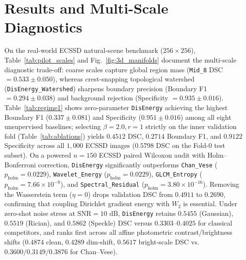 \documentclass[preprint,12pt]{elsarticle}
\begin{document}
\section{Results and Multi-Scale Diagnostics}
On the real-world ECSSD natural-scene benchmark ($256 \times 256$), Table~\ref{tab:pilot_scales} and Fig.~\ref{fig:3d_manifolds} document the multi-scale diagnostic trade-off: coarse scales capture global region mass (\texttt{Mid\_8} DSC $= 0.533 \pm 0.050$), whereas crest-snapping topological watershed (\texttt{DisEnergy\_Watershed}) sharpens boundary precision (Boundary F1 $= 0.294 \pm 0.038$) and background rejection (Specificity $= 0.935 \pm 0.016$). Table~\ref{tab:regime1} shows zero-parameter \texttt{DisEnergy} achieving the highest Boundary F1 ($0.337 \pm 0.081$) and Specificity ($0.951 \pm 0.016$) among all eight unsupervised baselines; selecting $\beta=2.0, r=1$ strictly on the inner validation fold (Table~\ref{tab:ablations}) yields $0.4512$ DSC, $0.2714$ Boundary F1, and $0.9122$ Specificity across all $1,000$ ECSSD images ($0.5798$ DSC on the Fold-0 test subset). On a powered $n=150$ ECSSD paired Wilcoxon audit with Holm--Bonferroni correction, \texttt{DisEnergy} significantly outperforms \texttt{Chan\_Vese} ($p_{\mathrm{holm}}=0.0229$), \texttt{Wavelet\_Energy} ($p_{\mathrm{holm}}=0.0229$), \texttt{GLCM\_Entropy} ($p_{\mathrm{holm}}=7.66\times 10^{-8}$), and \texttt{Spectral\_Residual} ($p_{\mathrm{holm}}=3.80\times 10^{-16}$). Removing the Wasserstein term ($\eta=0$) drops validation DSC from $0.4911$ to $0.2690$, confirming that coupling Dirichlet gradient energy with $W_2$ is essential. Under zero-shot noise stress at $\mathrm{SNR}=10\text{ dB}$, \texttt{DisEnergy} retains $0.5455$ (Gaussian), $0.5519$ (Rician), and $0.5862$ (Speckle) DSC versus $0.3303$--$0.4025$ for classical competitors, and ranks first across all affine photometric contrast/brightness shifts ($0.4874$ clean, $0.4289$ dim-shift, $0.5617$ bright-scale DSC vs.\ $0.3600/0.3149/0.3876$ for Chan--Vese).
\end{document}
